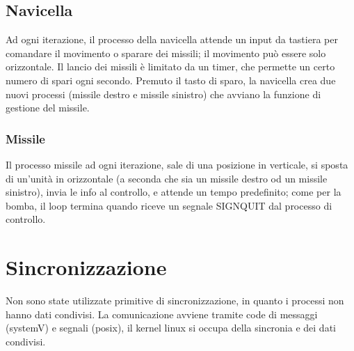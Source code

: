 \documentclass[a4paper,11pt]{report}
\begin{document}
\subsection{Navicella}
Ad ogni iterazione, il processo della navicella attende un input da tastiera per comandare il movimento
o sparare dei missili; il movimento può essere solo orizzontale. 
Il lancio dei missili è limitato da un timer, che permette un certo numero di spari ogni secondo.
Premuto il tasto di sparo, la navicella crea due nuovi processi (missile destro e missile sinistro)
che avviano la funzione di gestione del missile.

\subsubsection{Missile}
Il processo missile ad ogni iterazione, sale di una posizione in verticale, si sposta di un'unità in
orizzontale (a seconda che sia un missile destro od un missile sinistro), invia le info al controllo, e attende
un tempo predefinito; come per la bomba, il loop termina quando riceve un segnale SIGNQUIT dal processo di controllo.


\section{Sincronizzazione}
Non sono state utilizzate primitive di sincronizzazione, in quanto i processi non hanno dati
condivisi. La comunicazione avviene tramite code di messaggi (systemV) e segnali (posix), il kernel linux si occupa della sincronia
e dei dati condivisi.
\end{document}
